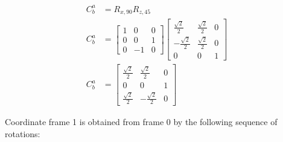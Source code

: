 \documentclass[12pt,letterpaper, onecolumn]{exam}
\begin{document}
\begin{questions}
\begin{parts}
        \begin{equation*}
            \begin{split}
                C_b^a & = R_{x,90}R_{z,45}\\
                C_b^a & =
                \begin{bmatrix}
                    1 & 0  & 0 \\
                    0 & 0  & 1 \\
                    0 & -1 & 0
                \end{bmatrix}
                \begin{bmatrix}
                    \frac{\sqrt{2}}{2}  & \frac{\sqrt{2}}{2} & 0 \\
                    -\frac{\sqrt{2}}{2} & \frac{\sqrt{2}}{2} & 0 \\
                    0                   & 0                  & 1
                \end{bmatrix} \\
                C_b^a & =
                \begin{bmatrix}
                    \frac{\sqrt{2}}{2} & \frac{\sqrt{2}}{2}  & 0 \\
                    0                  & 0                   & 1 \\
                    \frac{\sqrt{2}}{2} & -\frac{\sqrt{2}}{2} & 0
                \end{bmatrix}
            \end{split}
        \end{equation*}


    \end{parts}

    \clearpage

    \question
    Coordinate frame {1} is obtained from frame {0} by the following sequence of rotations:



\end{questions}
\end{document}
